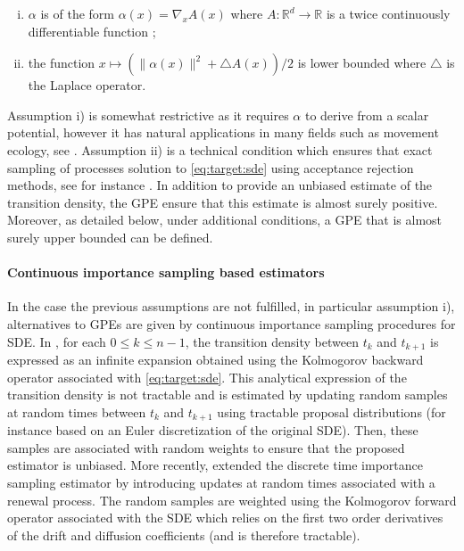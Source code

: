 \documentclass[12pt]{article}
\newcommand{\1}{\mathrm{1}}
\begin{document}
\begin{enumerate}[i)]
\item $\alpha$ is of the form $\alpha(x) = \nabla_x A(x)$ where $A: \mathbb{R}^d \to \mathbb{R}$ is a twice continuously differentiable function ;
\item the function $x\mapsto \left(\|\alpha(x)\|^2  + \triangle A(x)\right)/2$ is lower bounded where $\triangle$ is the Laplace operator.
\end{enumerate}
Assumption i) is somewhat restrictive as it requires $\alpha$ to derive from a scalar potential, however it has natural applications in many fields such as movement ecology, see \cite{gloaguen:etienne:lecorff:2017}. 
Assumption ii) is a technical condition which ensures that exact sampling of processes solution to  \eqref{eq:target:sde} using acceptance rejection methods, see for instance \cite{beskos:papaspiliopoulos:roberts:2006,beskos:papaspiliopoulos:roberts:2008,fearnhead:papaspiliopoulos:roberts:2008}.
In addition to provide an unbiased estimate of the transition density, the GPE ensure that this estimate is almost surely positive.  Moreover, as detailed below, under additional conditions, a GPE that is almost surely upper bounded can be defined.
\paragraph{Continuous importance sampling based estimators}
In the case the previous assumptions are not fulfilled, in particular assumption i),  alternatives to GPEs are given by continuous importance sampling procedures for SDE. 
In \cite{wagner:1989}, for each $0\le k \le n-1$, the transition density between $t_k$ and $t_{k+1}$ is expressed as an infinite expansion obtained using the Kolmogorov backward operator associated with  \eqref{eq:target:sde}. 
This analytical expression of the transition density is not tractable and is estimated by updating random samples at random times between $t_k$ and $t_{k+1}$ using tractable proposal distributions (for instance based on an Euler discretization of the original SDE). 
Then, these samples are associated with random weights to ensure that the proposed estimator is unbiased. More recently, \cite{fearnhead:latuszynski:roberts:sermaidis:2017} extended the discrete time importance sampling estimator by introducing updates at random times associated with a renewal process. 
The random samples are weighted using the Kolmogorov forward operator associated with the SDE which relies on the first two order derivatives  of the drift and diffusion coefficients (and is therefore tractable).
\end{document}
